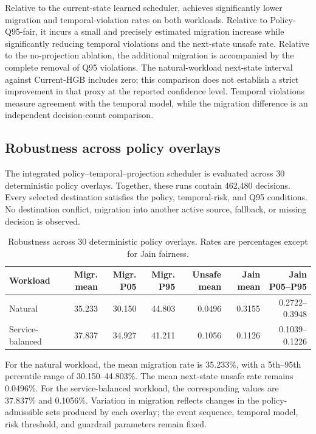 Relative to the current-state learned scheduler, \cage achieves
significantly lower migration and temporal-violation rates on both
workloads. Relative to Policy-Q95-fair, it incurs a small and precisely
estimated migration increase while significantly reducing temporal
violations and the next-state unsafe rate. Relative to the no-projection
ablation, the additional migration is accompanied by the complete removal
of Q95 violations. The natural-workload next-state interval against Current-HGB includes
zero; this comparison does not establish a strict improvement in that
proxy at the reported confidence level. Temporal violations measure
agreement with the temporal model, while the migration difference is an
independent decision-count comparison.

\subsection{Robustness across policy overlays}

The integrated policy--temporal--projection scheduler is evaluated across
30 deterministic policy overlays. Together, these runs contain 462,480
decisions. Every selected destination satisfies the policy,
temporal-risk, and Q95 conditions. No destination conflict, migration
into another active source, fallback, or missing decision is observed.

\begin{table}[t]
\centering
\caption{Robustness across 30 deterministic policy overlays. Rates are
percentages except for Jain fairness.}
\label{tab:seed-robustness}
\begin{tabular}{lrrrrrr}
\toprule
Workload &
Migr. mean &
Migr. P05 &
Migr. P95 &
Unsafe mean &
Jain mean &
Jain P05--P95 \\
\midrule
Natural &
35.233 &
30.150 &
44.803 &
0.0496 &
0.3155 &
0.2722--0.3948 \\

Service-balanced &
37.837 &
34.927 &
41.211 &
0.1056 &
0.1126 &
0.1039--0.1226 \\
\bottomrule
\end{tabular}
\end{table}

For the natural workload, the mean migration rate is 35.233\%, with a
5th--95th percentile range of 30.150--44.803\%. The mean next-state
unsafe rate remains 0.0496\%. For the service-balanced workload, the
corresponding values are 37.837\% and 0.1056\%. Variation in migration
reflects changes in the policy-admissible sets produced by each overlay;
the event sequence, temporal model, risk threshold, and guardrail
parameters remain fixed.




